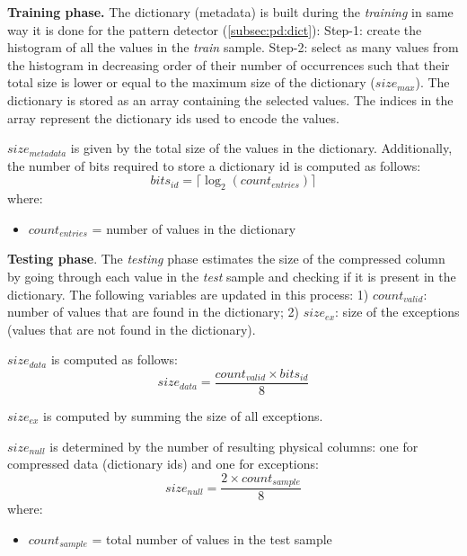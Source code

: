\textbf{Training phase.} The dictionary (metadata) is built during the \textit{training} in same way it is done for the  pattern detector (\ref{subsec:pd:dict}): Step-1: create the histogram of all the values in the \textit{train} sample. Step-2: select as many values from the histogram in decreasing order of their number of occurrences such that their total size is lower or equal to the maximum size of the dictionary (\(size_{max}\)). The dictionary is stored as an array containing the selected values. The indices in the array represent the dictionary ids used to encode the values.

\(size_{metadata}\) is given by the total size of the values in the dictionary. Additionally, the number of bits required to store a dictionary id is computed as follows:
\begin{equation}
\label{eq:estimators:dict:bitsid}
bits_{id} = \lceil \log_2 (count_{entries}) \rceil
\end{equation}
where:
\begin{itemize}
    \item[] \(count_{entries}\) = number of values in the dictionary
\end{itemize}

\textbf{Testing phase}. The \textit{testing} phase estimates the size of the compressed column by going through each value in the \textit{test} sample and checking if it is present in the dictionary. The following variables are updated in this process: 1) \(count_{valid}\): number of values that are found in the dictionary; 2) \(size_{ex}\): size of the exceptions (values that are not found in the dictionary).

\(size_{data}\) is computed as follows:
\begin{equation}
\label{eq:estimators:dict:sizedata}
size_{data} = \frac{count_{valid} \times bits_{id}}{8}
\end{equation}

\(size_{ex}\) is computed by summing the size of all exceptions.

\(size_{null}\) is determined by the number of resulting physical columns: one for compressed data (dictionary ids) and one for exceptions:
\begin{equation}
\label{eq:estimators:dict:sizenull}
size_{null} = \frac{2 \times count_{sample}}{8}
\end{equation}
where:
\begin{itemize}
    \item[] \(count_{sample}\) = total number of values in the test sample
\end{itemize}


